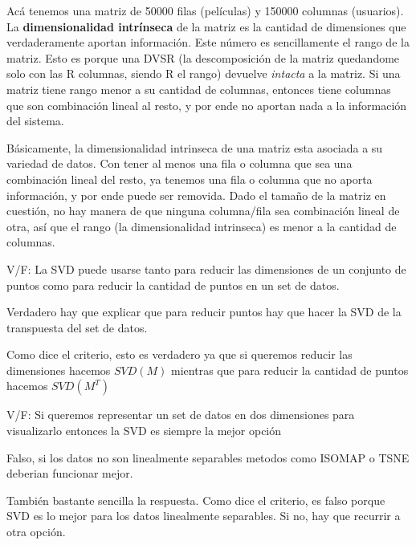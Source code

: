 \documentclass[a4paper]{article}
\newenvironment{enunciado}[3]{%
    \vspace{\baselineskip}
    \tcolorbox[beamer,%
    noparskip,breakable,
    colback=LightGreen,colframe=DarkGreen,%
    colbacklower=LimeGreen!75!LightGreen,%
    title=\small Enunciado: Año #1\, Cuatrimestre #2\, Oportunidad #3]}%
    {\endtcolorbox}
\newenvironment{criterio}[3]{%
    \tcolorbox[beamer,%
    noparskip,breakable,
    colback=LightCoral,colframe=DarkRed,%
    colbacklower=Tomato!75!LightCoral,%
    title=\small Criterio de Corrección: Año #1\, Cuatrimestre #2\, Oportunidad #3]}%
    {\endtcolorbox}
\begin{document}
    Acá tenemos una matriz de 50000 filas (películas) y 150000 columnas (usuarios). La \textbf{dimensionalidad intrínseca} de la matriz es la cantidad de dimensiones que verdaderamente aportan información. Este número es sencillamente el rango de la matriz. Esto es porque una DVSR (la descomposición de la matriz quedandome solo con las R columnas, siendo R el rango) devuelve \textit{intacta} a la matriz. Si una matriz tiene rango menor a su cantidad de columnas, entonces tiene columnas que son combinación lineal al resto, y por ende no aportan nada a la información del sistema.
    
    Básicamente, la dimensionalidad intrinseca de una matriz esta asociada a su variedad de datos. Con tener al menos una fila o columna que sea una combinación lineal del resto, ya tenemos una fila o columna que no aporta información, y por ende puede ser removida. Dado el tamaño de la matriz en cuestión, no hay manera de que ninguna columna/fila sea combinación lineal de otra, así que el rango (la dimensionalidad intrinseca) es menor a la cantidad de columnas.
    
    \begin{enunciado}{2015}{2}{2}
        V/F: La SVD puede usarse tanto para reducir   las   dimensiones   de   un conjunto   de   puntos   como   para reducir la cantidad de puntos en un set de datos.
    \end{enunciado}
    
    \begin{criterio}{2015}{2}{2}
        Verdadero hay que explicar que para reducir puntos hay que hacer la SVD de la transpuesta del set de datos.
    \end{criterio}

    Como dice el criterio, esto es verdadero ya que si queremos reducir las dimensiones hacemos $SVD(M)$ mientras que para reducir la cantidad de puntos hacemos $SVD(M^T)$

    \begin{enunciado}{2015}{2}{2}
        V/F: Si queremos representar un set de datos en dos dimensiones para visualizarlo   entonces   la   SVD   es siempre la mejor opción
    \end{enunciado}
    
    \begin{criterio}{2015}{2}{2}
        Falso, si los datos no son linealmente separables metodos como ISOMAP o TSNE deberian funcionar mejor. 
    \end{criterio}

    También bastante sencilla la respuesta. Como dice el criterio, es falso porque SVD es lo mejor para los datos linealmente separables. Si no, hay que recurrir a otra opción.
\end{document}
